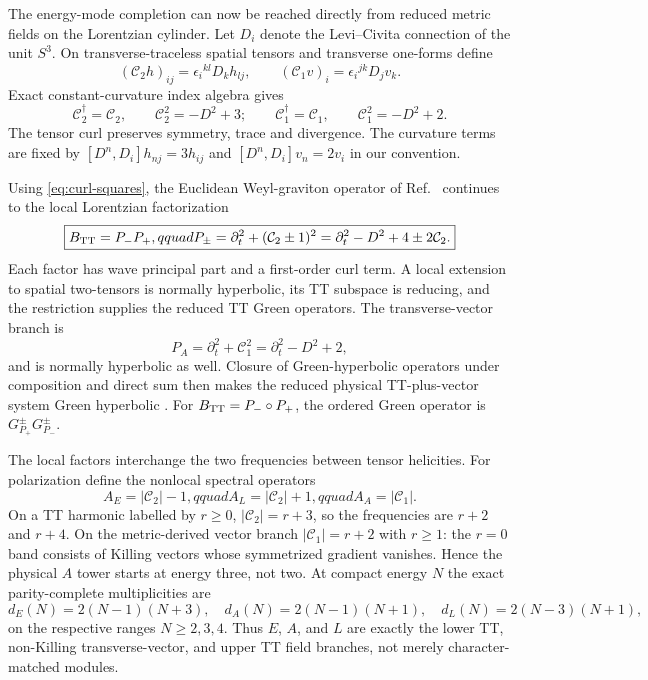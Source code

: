 \documentclass[11pt]{article}
\theoremstyle{definition}
\theoremstyle{remark}
\begin{document}
The energy-mode completion can now be reached directly from reduced metric
fields on the Lorentzian cylinder.  Let $D_i$ denote the Levi--Civita
connection of the unit $S^3$.  On transverse-traceless spatial tensors and
transverse one-forms define
\begin{equation}
 (\mathcal C_2h)_{ij}=\epsilon_i{}^{kl}D_kh_{lj},
 \qquad
 (\mathcal C_1v)_i=\epsilon_i{}^{jk}D_jv_k.
\end{equation}
Exact constant-curvature index algebra gives
\begin{equation}\label{eq:curl-squares}
 \boxed{
 \mathcal C_2^\dagger=\mathcal C_2,\qquad
 \mathcal C_2^2=-D^2+3;
 \qquad
 \mathcal C_1^\dagger=\mathcal C_1,\qquad
 \mathcal C_1^2=-D^2+2.}
\end{equation}
The tensor curl preserves symmetry, trace and divergence.  The curvature
terms are fixed by
$[D^n,D_i]h_{nj}=3h_{ij}$ and $[D^n,D_i]v_n=2v_i$ in our convention.

Using \eqref{eq:curl-squares}, the Euclidean Weyl-graviton operator of
Ref.~\cite{BeccariaBekaertTseytlin} continues to the local Lorentzian
factorization
\begin{equation}\label{eq:local-tt-factors}
 \boxed{
 B_{\rm TT}=P_-P_+,qquad
 P_\pm=\partial_t^2+(\mathcal C_2\pm1)^2
       =\partial_t^2-D^2+4\pm2\mathcal C_2.}
\end{equation}
Each factor has wave principal part and a first-order curl term.  A local
extension to spatial two-tensors is normally hyperbolic, its TT subspace is
reducing, and the restriction supplies the reduced TT Green operators.  The
transverse-vector branch is
\begin{equation}\label{eq:vector-wave-factor}
 P_A=\partial_t^2+\mathcal C_1^2
    =\partial_t^2-D^2+2,
\end{equation}
and is normally hyperbolic as well.  Closure of Green-hyperbolic operators
under composition and direct sum then makes the reduced physical TT-plus-vector
system Green hyperbolic \cite{BaerGreenHyperbolic}.  For
$B_{\rm TT}=P_-\circ P_+$, the ordered Green operator is
$G_{P_+}^{\pm}G_{P_-}^{\pm}$.

The local factors interchange the two frequencies between tensor
helicities.  For polarization define the nonlocal spectral operators
\begin{equation}
 A_E=|\mathcal C_2|-1,qquad
 A_L=|\mathcal C_2|+1,qquad
 A_A=|\mathcal C_1|.
\end{equation}
On a TT harmonic labelled by $r\ge0$, $|\mathcal C_2|=r+3$, so the
frequencies are $r+2$ and $r+4$.  On the metric-derived vector branch
$|\mathcal C_1|=r+2$ with $r\ge1$: the $r=0$ band consists of Killing
vectors whose symmetrized gradient vanishes.  Hence the physical $A$ tower
starts at energy three, not two.  At compact energy $N$ the exact
parity-complete multiplicities are
\begin{equation}\label{eq:field-eal-dictionary}
 \boxed{
 d_E(N)=2(N-1)(N+3),\quad
 d_A(N)=2(N-1)(N+1),\quad
 d_L(N)=2(N-3)(N+1),}
\end{equation}
on the respective ranges $N\ge2,3,4$.  Thus $E$, $A$, and $L$ are exactly
the lower TT, non-Killing transverse-vector, and upper TT field branches,
not merely character-matched modules.
\end{document}
